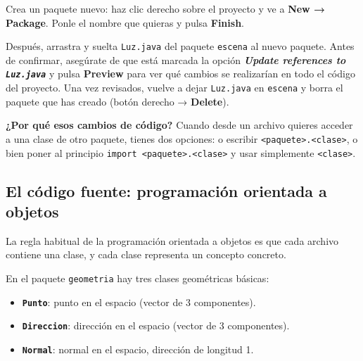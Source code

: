 \documentclass[
  spanish,
  11pt,
  a4paper,
  DIV=11,
  numbers=noendperiod]{scrartcl}
\providecommand{\tightlist}{%
  \setlength{\itemsep}{0pt}\setlength{\parskip}{0pt}}
\begin{document}
\begin{tcolorbox}[enhanced jigsaw, colframe=quarto-callout-note-color-frame, arc=.35mm, bottomrule=.15mm, left=2mm, breakable, opacityback=0, coltitle=black, bottomtitle=1mm, toptitle=1mm, titlerule=0mm, toprule=.15mm, rightrule=.15mm, title={Experimenta con los paquetes}, colbacktitle=quarto-callout-note-color!10!white, opacitybacktitle=0.6, colback=white, leftrule=.75mm]

Crea un paquete nuevo: haz clic derecho sobre el proyecto y ve a \textbf{New → Package}. Ponle el nombre que quieras y pulsa \textbf{Finish}.

Después, arrastra y suelta \texttt{Luz.java} del paquete \texttt{escena} al nuevo paquete. Antes de confirmar, asegúrate de que está marcada la opción \textbf{\emph{Update references to \texttt{Luz.java}}} y pulsa \textbf{Preview} para ver qué cambios se realizarían en todo el código del proyecto. Una vez revisados, vuelve a dejar \texttt{Luz.java} en \texttt{escena} y borra el paquete que has creado (botón derecho → \textbf{Delete}).

\textbf{¿Por qué esos cambios de código?} Cuando desde un archivo quieres acceder a una clase de otro paquete, tienes dos opciones: o escribir \texttt{\textless{}paquete\textgreater{}.\textless{}clase\textgreater{}}, o bien poner al principio \texttt{import\ \textless{}paquete\textgreater{}.\textless{}clase\textgreater{}} y usar simplemente \texttt{\textless{}clase\textgreater{}}.

\end{tcolorbox}

\subsection{El código fuente: programación orientada a objetos}

\label{el-código-fuente-programación-orientada-a-objetos}

La regla habitual de la programación orientada a objetos es que cada archivo contiene una clase, y cada clase representa un concepto concreto.

En el paquete \texttt{geometria} hay tres clases geométricas básicas:

\begin{itemize}
\tightlist
\item
  \textbf{\texttt{Punto}}: punto en el espacio (vector de 3 componentes).
\item
  \textbf{\texttt{Direccion}}: dirección en el espacio (vector de 3 componentes).
\item
  \textbf{\texttt{Normal}}: normal en el espacio, dirección de longitud 1.
\end{itemize}
\end{document}
